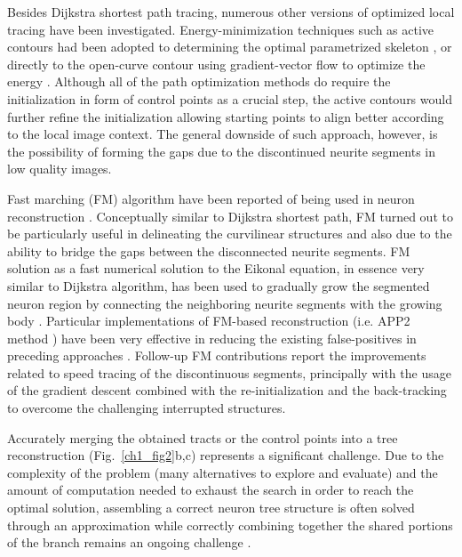 Besides Dijkstra shortest path tracing, numerous other versions of optimized local tracing have been investigated. Energy-minimization techniques such as active contours had been adopted to determining the optimal parametrized skeleton \cite{schmitt2004new}, or directly to the open-curve contour using gradient-vector flow to optimize the energy \cite{wang2011broadly}. Although all of the path optimization methods do require the initialization in form of control points as a crucial step, the active contours would further refine the initialization allowing starting points to align better according to the local image context. The general downside of such approach, however, is the possibility of forming the gaps due to the discontinued neurite segments in low quality images. 

Fast marching (FM) algorithm \cite{sethian1999level} have been reported of being used in neuron reconstruction \cite{xiao2013app2,peng2011automatic,mukherjee2012automated,van2007subvoxel,santamaria2015automatic,basu2014reconstructing}. Conceptually similar to Dijkstra shortest path, FM turned out to be particularly useful in delineating the curvilinear structures and also due to the ability to bridge the gaps between the disconnected neurite segments. FM solution as a fast numerical solution to the Eikonal equation, in essence very similar to Dijkstra algorithm, has been used to gradually grow the segmented neuron region by connecting the neighboring neurite segments with the growing body \cite{peng2011automatic}. Particular implementations of FM-based reconstruction (i.e. APP2 method \cite{xiao2013app2}) have been very effective in reducing the existing false-positives in preceding approaches \cite{van2007subvoxel,peng2011automatic}. Follow-up FM contributions report the improvements related to speed tracing of the discontinuous segments, principally with the usage of the gradient descent combined with the re-initialization \cite{mukherjee2012automated} and the back-tracking \cite{liu2016rivulet} to overcome the challenging interrupted structures.  

Accurately merging the obtained tracts or the control points into a tree reconstruction (Fig.~\ref{ch1_fig2}b,c) represents a significant challenge. Due to the complexity of the problem (many alternatives to explore and evaluate) and the amount of computation needed to exhaust the search in order to reach the optimal solution, assembling a correct neuron tree structure is often solved through an approximation while correctly combining together the shared portions of the branch remains an ongoing challenge \cite{peng2015bigneuron}.

